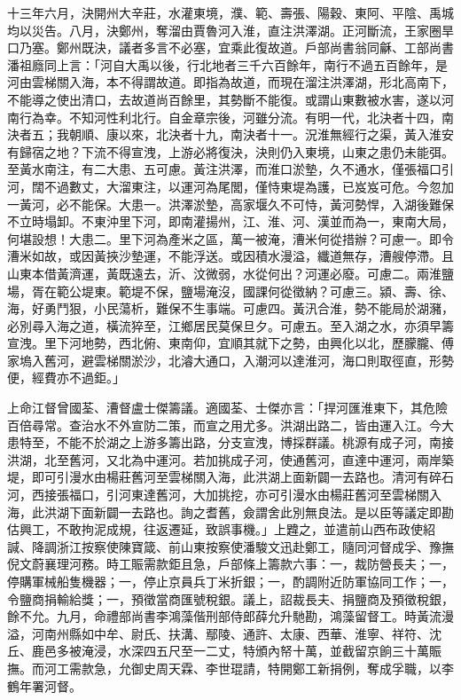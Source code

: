 \begin{pinyinscope}
十三年六月，決開州大辛莊，水灌東境，濮、範、壽張、陽穀、東阿、平陰、禹城均以災告。八月，決鄭州，奪溜由賈魯河入淮，直注洪澤湖。正河斷流，王家圈旱口乃塞。鄭州既決，議者多言不必塞，宜乘此復故道。戶部尚書翁同龢、工部尚書潘祖廕同上言：「河自大禹以後，行北地者三千六百餘年，南行不過五百餘年，是河由雲梯關入海，本不得謂故道。即指為故道，而現在溜注洪澤湖，形北高南下，不能導之使出清口，去故道尚百餘里，其勢斷不能復。或謂山東數被水害，遂以河南行為幸。不知河性利北行。自金章宗後，河雖分流。有明一代，北決者十四，南決者五；我朝順、康以來，北決者十九，南決者十一。況淮無經行之渠，黃入淮安有歸宿之地？下流不得宣洩，上游必將復決，決則仍入東境，山東之患仍未能弭。至黃水南注，有二大患、五可慮。黃注洪澤，而淮口淤墊，久不通水，僅張福口引河，闊不過數丈，大溜東注，以運河為尾閭，僅恃東堤為護，已岌岌可危。今忽加一黃河，必不能保。大患一。洪澤淤墊，高家堰久不可恃，黃河勢悍，入湖後難保不立時塌卸。不東沖里下河，即南灌揚州，江、淮、河、漢並而為一，東南大局，何堪設想！大患二。里下河為產米之區，萬一被淹，漕米何從措辦？可慮一。即令漕米如故，或因黃挾沙墊運，不能浮送。或因積水漫溢，纖道無存，漕艘停滯。且山東本借黃濟運，黃既遠去，沂、汶微弱，水從何出？河運必廢。可慮二。兩淮鹽場，胥在範公堤東。範堤不保，鹽場淹沒，國課何從徵納？可慮三。潁、壽、徐、海，好勇鬥狠，小民蕩析，難保不生事端。可慮四。黃汛合淮，勢不能局於湖瀦，必別尋入海之道，橫流猝至，江鄉居民莫保旦夕。可慮五。至入湖之水，亦須早籌宣洩。里下河地勢，西北俯、東南仰，宜順其就下之勢，由興化以北，歷朦朧、傅家塢入舊河，避雲梯關淤沙，北濬大通口，入潮河以達淮河，海口則取徑直，形勢便，經費亦不過鉅。」

上命江督曾國荃、漕督盧士傑籌議。適國荃、士傑亦言：「捍河匯淮東下，其危險百倍尋常。查治水不外宣防二策，而宣之用尤多。洪湖出路二，皆由運入江。今大患特至，不能不於湖之上游多籌出路，分支宣洩，博採群議。桃源有成子河，南接洪湖，北至舊河，又北為中運河。若加挑成子河，使通舊河，直達中運河，兩岸築堤，即可引漫水由楊莊舊河至雲梯關入海，此洪湖上面新闢一去路也。清河有碎石河，西接張福口，引河東達舊河，大加挑挖，亦可引漫水由楊莊舊河至雲梯關入海，此洪湖下面新闢一去路也。詢之耆舊，僉謂舍此別無良法。是以臣等議定即勘估興工，不敢拘泥成規，往返遷延，致誤事機。」上韙之，並遣前山西布政使紹諴、降調浙江按察使陳寶箴、前山東按察使潘駿文迅赴鄭工，隨同河督成孚、豫撫倪文蔚襄理河務。時工賑需款鉅且急，戶部條上籌款六事：一，裁防營長夫；一，停購軍械船隻機器；一，停止京員兵丁米折銀；一，酌調附近防軍協同工作；一，令鹽商捐輸給獎；一，預徵當商匯號稅銀。議上，詔裁長夫、捐鹽商及預徵稅銀，餘不允。九月，命禮部尚書李鴻藻偕刑部侍郎薛允升馳勘，鴻藻留督工。時黃流漫溢，河南州縣如中牟、尉氏、扶溝、鄢陵、通許、太康、西華、淮寧、祥符、沈丘、鹿邑多被淹浸，水深四五尺至一二丈，特頒內帑十萬，並截留京餉三十萬賑撫。而河工需款急，允御史周天霖、李世琨請，特開鄭工新捐例，奪成孚職，以李鶴年署河督。


\end{pinyinscope}
